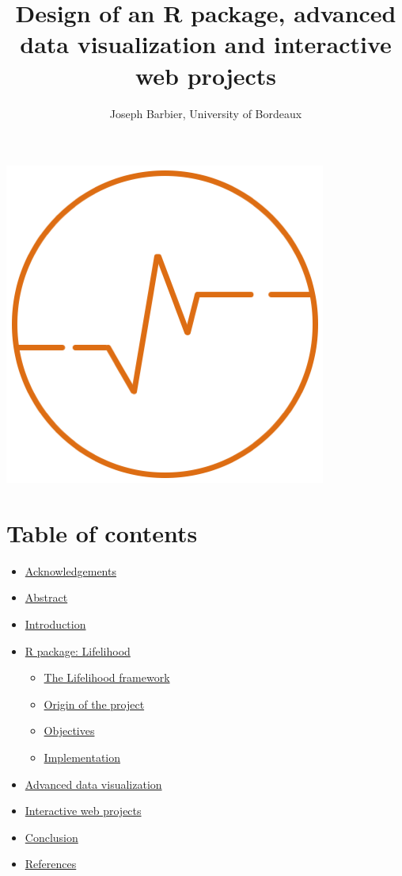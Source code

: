 \documentclass[
]{article}
\title{Design of an R package, advanced data visualization and
interactive web projects}
\author{Joseph Barbier, University of Bordeaux}
\date{}
\providecommand{\tightlist}{%
  \setlength{\itemsep}{0pt}\setlength{\parskip}{0pt}}
\begin{document}
\maketitle

\hfill\break

\hfill\break

\hfill\break

\begin{center}\includegraphics[width=0.5\linewidth]{logo_top} \end{center}

\newpage

\section{\texorpdfstring{Table of contents\\
}{Table of contents }}\label{table-of-contents}

\begin{itemize}
\tightlist
\item
  \hyperref[acknowledgements]{Acknowledgements}\\
\item
  \hyperref[abstract]{Abstract}\\
\item
  \hyperref[introduction]{Introduction}\\
\item
  \hyperref[r-package-lifelihood]{R package: Lifelihood}

  \begin{itemize}
  \tightlist
  \item
    \hyperref[the-lifelihood-framework]{The Lifelihood framework}
  \item
    \hyperref[origin-of-the-project]{Origin of the project}
  \item
    \hyperref[objectives]{Objectives}
  \item
    \hyperref[implementation]{Implementation}\\
  \end{itemize}
\item
  \hyperref[advanced-data-visualization]{Advanced data visualization}\\
\item
  \hyperref[interactive-web-projects]{Interactive web projects}\\
\item
  \hyperref[conclusion]{Conclusion}\\
\item
  \hyperref[references]{References}
\end{itemize}
\end{document}
